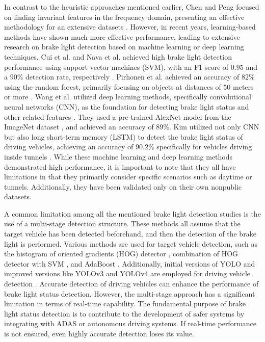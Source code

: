 In contrast to the heuristic approaches mentioned earlier, Chen and Peng focused on finding invariant features in the frequency domain, presenting an effective methodology for an extensive datasets \cite{chen2012frequency}.
However, in recent years, learning-based methods have shown much more effective performance, leading to extensive research on brake light detection based on machine learning or deep learning techniques.
Cui et al. and Nava et al. achieved high brake light detection performance using support vector machines (SVM), with an F1 score of $0.95$ and a $90\%$ detection rate, respectively \cite{cui2015vision, nava2019collision}. 
Pirhonen et al. achieved an accuracy of $82\%$ using the random forest, primarily focusing on objects at distances of $50$ meters or more \cite{pirhonen2022brake}.
Wang et al. utilized deep learning methods, specifically convolutional neural networks (CNN), as the foundation for detecting brake light status and other related features \cite{wang2016appearance}.
They used a pre-trained AlexNet model \cite{krizhevsky2012imagenet} from the ImageNet dataset \cite{russakovsky2015imagenet}, and achieved an accuracy of $89\%$.
Kim utilized not only CNN but also long short-term memory (LSTM) to detect the brake light status of driving vehicles, achieving an accuracy of $90.2\%$ specifically for vehicles driving inside tunnels \cite{kim2022detecting}.
While these machine learning and deep learning methods demonstrated high performance, it is important to note that they all have limitations in that they primarily consider specific scenarios such as daytime or tunnels.
Additionally, they have been validated only on their own nonpublic datasets.

A common limitation among all the mentioned brake light detection studies is the use of a multi-stage detection structure.
These methods all assume that the target vehicle has been detected beforehand, and then the detection of the brake light is performed.
Various methods are used for target vehicle detection, such as the histogram of oriented gradients (HOG) detector \cite{chen2015daytime, wang2016appearance}, combination of HOG detector with SVM \cite{cui2015vision}, and AdaBoost \cite{liu2015vision, freund1996experiments}.
Additionally, initial versions of YOLO \cite{redmon2016you, redmon2017yolo9000} and improved versions like YOLOv3 \cite{redmon2018yolov3} and YOLOv4 \cite{bochkovskiy2020yolov4} are employed for driving vehicle detection \cite{pirhonen2022brake, kim2022detecting}.
Accurate detection of driving vehicles can enhance the performance of brake light status detection. 
However, the multi-stage approach has a significant limitation in terms of real-time capability. 
The fundamental purpose of brake light status detection is to contribute to the development of safer systems by integrating with ADAS or autonomous driving systems. If real-time performance is not ensured, even highly accurate detection loses its value.

